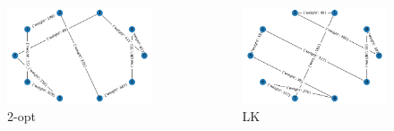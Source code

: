 \documentclass[10pt]{beamer}
\begin{document}
\begin{frame}
\begin{columns}
\begin{minipage}[c][0.4\textheight][c]{\linewidth}
\begin{figure}
  \includegraphics[width=0.8\linewidth]{primeri/primer2_2opt.png}
\caption{2-opt}
\label{Slika 6}
\end{figure}
\end{minipage}

\begin{minipage}[c][0.4\textheight][c]{\linewidth}
\begin{figure}
  \includegraphics[width=0.8\linewidth]{primeri/primer2_lk.png}
\caption{LK}
\label{Slika 8}
\end{figure}
\end{minipage}
\end{columns}

\end{frame}
\end{document}
